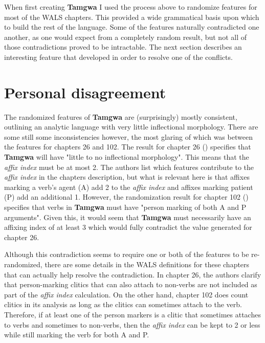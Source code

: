 \documentclass[a4paper,12pt,twoside,openright]{memoir}
\begin{document}
    When first creating \textbf{Tamgwa} I used the process above to randomize features for most of the WALS chapters.  This provided a wide grammatical basis upon which to build the rest of the language.  Some of the features naturally contradicted one another, as one would expect from a completely random result, but not all of those contradictions proved to be intractable.  The next section describes an interesting feature that developed in order to resolve one of the conflicts.

\section*{Personal disagreement} %

    The randomized features of \textbf{Tamgwa} are (surprisingly) mostly consistent, outlining an analytic language with very little inflectional morphology.  There are some still some inconsistencies however, the most glaring of which was between the features for chapters 26 and 102.  The result for chapter 26 () specifies that \textbf{Tamgwa} will have "little to no inflectional morphology".  This means that the \textit{affix index} must be at most 2.  The authors list which features contribute to the \textit{affix index} in the chapters description, but what is relevant here is that affixes marking a verb's agent (A) add 2 to the \textit{affix index} and affixes marking patient (P) add an additional 1.  However, the randomization result for chapter 102 () specifies that verbs in \textbf{Tamgwa} must have "person marking of both A and P arguments".  Given this, it would seem that \textbf{Tamgwa} must necessarily have an affixing index of at least 3 which would fully contradict the value generated for chapter 26.

    Although this contradiction seems to require one or both of the features to be re-randomized, there are some details in the WALS definitions for these chapters that can actually help resolve the contradiction.  In chapter 26, the authors clarify that person-marking clitics that can also attach to non-verbs are not included as part of the \textit{affix index} calculation.  On the other hand, chapter 102 does count clitics in its analysis as long as the clitics can sometimes attach to the verb.  Therefore, if at least one of the person markers is a clitic that sometimes attaches to verbs and sometimes to non-verbs, then the \textit{affix index} can be kept to 2 or less while still marking the verb for both A and P.
\end{document}
